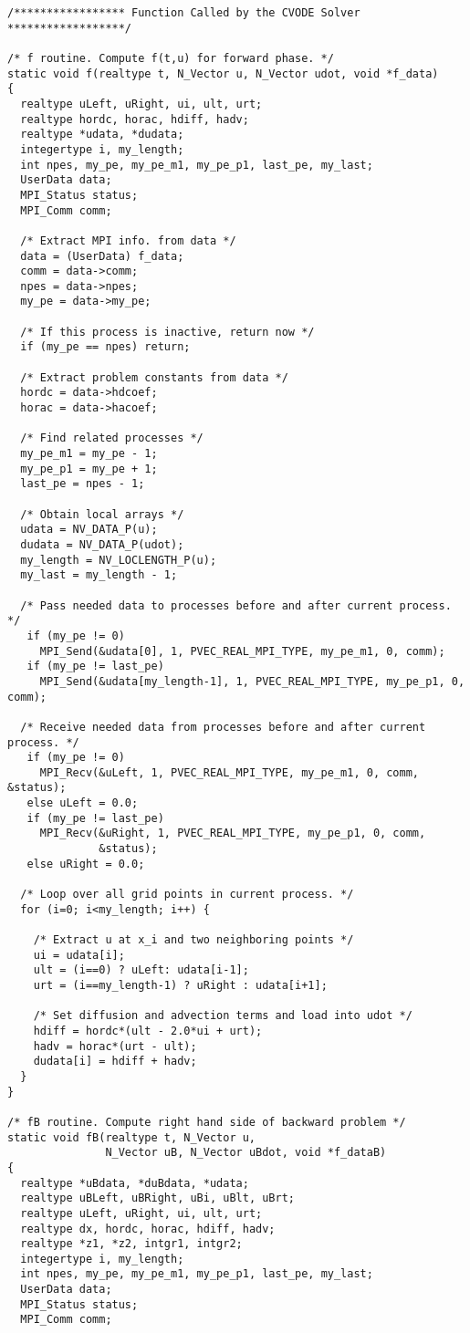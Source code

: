 \begin{verbatim}
/***************** Function Called by the CVODE Solver ******************/

/* f routine. Compute f(t,u) for forward phase. */
static void f(realtype t, N_Vector u, N_Vector udot, void *f_data)
{
  realtype uLeft, uRight, ui, ult, urt;
  realtype hordc, horac, hdiff, hadv;
  realtype *udata, *dudata;
  integertype i, my_length;
  int npes, my_pe, my_pe_m1, my_pe_p1, last_pe, my_last;
  UserData data;
  MPI_Status status;
  MPI_Comm comm;

  /* Extract MPI info. from data */
  data = (UserData) f_data;
  comm = data->comm;
  npes = data->npes;
  my_pe = data->my_pe;
  
  /* If this process is inactive, return now */
  if (my_pe == npes) return;

  /* Extract problem constants from data */
  hordc = data->hdcoef;
  horac = data->hacoef;

  /* Find related processes */
  my_pe_m1 = my_pe - 1;
  my_pe_p1 = my_pe + 1;
  last_pe = npes - 1;

  /* Obtain local arrays */
  udata = NV_DATA_P(u);
  dudata = NV_DATA_P(udot);
  my_length = NV_LOCLENGTH_P(u);
  my_last = my_length - 1;

  /* Pass needed data to processes before and after current process. */
   if (my_pe != 0)
     MPI_Send(&udata[0], 1, PVEC_REAL_MPI_TYPE, my_pe_m1, 0, comm);
   if (my_pe != last_pe)
     MPI_Send(&udata[my_length-1], 1, PVEC_REAL_MPI_TYPE, my_pe_p1, 0, comm);   

  /* Receive needed data from processes before and after current process. */
   if (my_pe != 0)
     MPI_Recv(&uLeft, 1, PVEC_REAL_MPI_TYPE, my_pe_m1, 0, comm, &status);
   else uLeft = 0.0;
   if (my_pe != last_pe)
     MPI_Recv(&uRight, 1, PVEC_REAL_MPI_TYPE, my_pe_p1, 0, comm,
              &status);   
   else uRight = 0.0;

  /* Loop over all grid points in current process. */
  for (i=0; i<my_length; i++) {

    /* Extract u at x_i and two neighboring points */
    ui = udata[i];
    ult = (i==0) ? uLeft: udata[i-1];
    urt = (i==my_length-1) ? uRight : udata[i+1];

    /* Set diffusion and advection terms and load into udot */
    hdiff = hordc*(ult - 2.0*ui + urt);
    hadv = horac*(urt - ult);
    dudata[i] = hdiff + hadv;
  }
}

/* fB routine. Compute right hand side of backward problem */
static void fB(realtype t, N_Vector u, 
               N_Vector uB, N_Vector uBdot, void *f_dataB)
{
  realtype *uBdata, *duBdata, *udata;
  realtype uBLeft, uBRight, uBi, uBlt, uBrt;
  realtype uLeft, uRight, ui, ult, urt;
  realtype dx, hordc, horac, hdiff, hadv;
  realtype *z1, *z2, intgr1, intgr2;
  integertype i, my_length;
  int npes, my_pe, my_pe_m1, my_pe_p1, last_pe, my_last;
  UserData data;
  MPI_Status status;
  MPI_Comm comm;


\end{verbatim}
